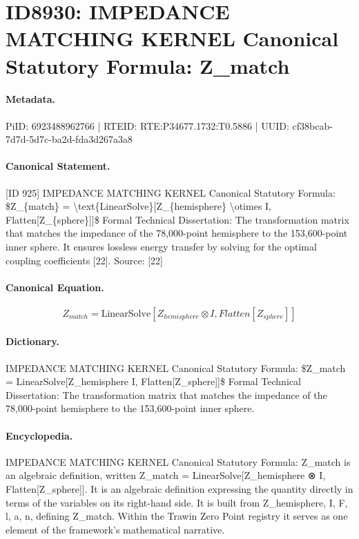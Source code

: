\section*{ID8930: IMPEDANCE MATCHING KERNEL Canonical Statutory Formula: Z\_match}
\paragraph{Metadata.}
PiID: 6923488962766 | RTEID: RTE:P34677.1732:T0.5886 | UUID: cf38bcab-7d7d-5d7c-ba2d-fda3d267a3a8

\paragraph{Canonical Statement.}
[ID 925] IMPEDANCE MATCHING KERNEL Canonical Statutory Formula: \$Z\_\{match\} = \textbackslash{}text\{LinearSolve\}[Z\_\{hemisphere\} \textbackslash{}otimes I, Flatten[Z\_\{sphere\}]]\$ Formal Technical Dissertation: The transformation matrix that matches the impedance of the 78,000-point hemisphere to the 153,600-point inner sphere. It ensures lossless energy transfer by solving for the optimal coupling coefficients [22]. Source: [22]

\paragraph{Canonical Equation.}
\[
Z_{match} = \text{LinearSolve}[Z_{hemisphere} \otimes I, Flatten[Z_{sphere}]]
\]

\paragraph{Dictionary.}
IMPEDANCE MATCHING KERNEL Canonical Statutory Formula: \$Z\_match = LinearSolve[Z\_hemisphere I, Flatten[Z\_sphere]]\$ Formal Technical Dissertation: The transformation matrix that matches the impedance of the 78,000-point hemisphere to the 153,600-point inner sphere.

\paragraph{Encyclopedia.}
IMPEDANCE MATCHING KERNEL Canonical Statutory Formula: Z\_match is an algebraic definition, written Z\_match = LinearSolve[Z\_hemisphere ⊗ I, Flatten[Z\_sphere]]. It is an algebraic definition expressing the quantity directly in terms of the variables on its right-hand side. It is built from Z\_hemisphere, I, F, l, a, n, defining Z\_match. Within the Trawin Zero Point registry it serves as one element of the framework's mathematical narrative.
